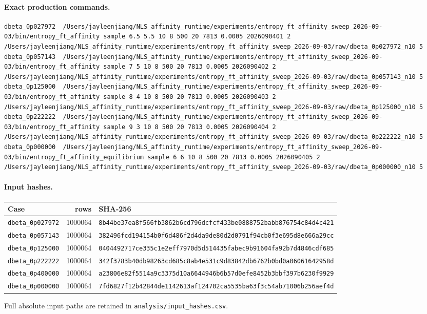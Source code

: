 \documentclass[10pt]{article}
\begin{document}
\paragraph{Exact production commands.}
\begin{Verbatim}[fontsize=\scriptsize,breaklines=true,breakanywhere=true]
dbeta_0p027972  /Users/jayleenjiang/NLS_affinity_runtime/experiments/entropy_ft_affinity_sweep_2026-09-03/bin/entropy_ft_affinity sample 6.5 5.5 10 8 500 20 7813 0.0005 2026090401 2 /Users/jayleenjiang/NLS_affinity_runtime/experiments/entropy_ft_affinity_sweep_2026-09-03/raw/dbeta_0p027972_n10 5
dbeta_0p057143  /Users/jayleenjiang/NLS_affinity_runtime/experiments/entropy_ft_affinity_sweep_2026-09-03/bin/entropy_ft_affinity sample 7 5 10 8 500 20 7813 0.0005 2026090402 2 /Users/jayleenjiang/NLS_affinity_runtime/experiments/entropy_ft_affinity_sweep_2026-09-03/raw/dbeta_0p057143_n10 5
dbeta_0p125000  /Users/jayleenjiang/NLS_affinity_runtime/experiments/entropy_ft_affinity_sweep_2026-09-03/bin/entropy_ft_affinity sample 8 4 10 8 500 20 7813 0.0005 2026090403 2 /Users/jayleenjiang/NLS_affinity_runtime/experiments/entropy_ft_affinity_sweep_2026-09-03/raw/dbeta_0p125000_n10 5
dbeta_0p222222  /Users/jayleenjiang/NLS_affinity_runtime/experiments/entropy_ft_affinity_sweep_2026-09-03/bin/entropy_ft_affinity sample 9 3 10 8 500 20 7813 0.0005 2026090404 2 /Users/jayleenjiang/NLS_affinity_runtime/experiments/entropy_ft_affinity_sweep_2026-09-03/raw/dbeta_0p222222_n10 5
dbeta_0p000000  /Users/jayleenjiang/NLS_affinity_runtime/experiments/entropy_ft_affinity_sweep_2026-09-03/bin/entropy_ft_affinity_equilibrium sample 6 6 10 8 500 20 7813 0.0005 2026090405 2 /Users/jayleenjiang/NLS_affinity_runtime/experiments/entropy_ft_affinity_sweep_2026-09-03/raw/dbeta_0p000000_n10 5
\end{Verbatim}
\paragraph{Input hashes.}
\begin{longtable}{lrp{}}
\toprule Case & rows & SHA-256 \\
\midrule\endhead
\texttt{dbeta\_0p027972} & 1000064 & \scriptsize\nolinkurl{8b44be37ea8f566fb3862b6cd796dcfcf433be0888752babb876754c84d4c421} \\
\texttt{dbeta\_0p057143} & 1000064 & \scriptsize\nolinkurl{382496fcd194154b0f6d486f2d4da9de80d2d0791f94cb0f3e695d8e666a29cc} \\
\texttt{dbeta\_0p125000} & 1000064 & \scriptsize\nolinkurl{0404492717ce335c1e2eff7970d5d514435fabec9b91604fa92b7d4846cdf685} \\
\texttt{dbeta\_0p222222} & 1000064 & \scriptsize\nolinkurl{342f3783b40db98263cd685c8ab4e531c9d83842db6762b0bd0a06061642958d} \\
\texttt{dbeta\_0p400000} & 1000064 & \scriptsize\nolinkurl{a23806e82f5514a9c3375d10a6644946b6b57d0efe8452b3bbf397b6230f9929} \\
\texttt{dbeta\_0p000000} & 1000064 & \scriptsize\nolinkurl{7fd6827f12b42844de1142613af124702ca5535ba63f3c54ab71006b256aef4d} \\
\bottomrule\end{longtable}
\noindent Full absolute input paths are retained in \texttt{analysis/input\_hashes.csv}.
\end{document}
